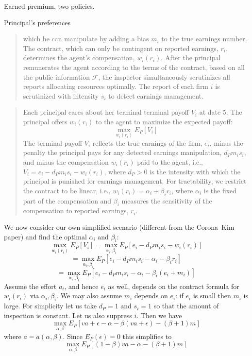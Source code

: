 \begin{example}{Earned premium, two policies.}
\begin{example}{Principal's preferences}
\begin{quote}
			which he can manipulate by adding a bias $m_i$ to the true earnings number.
			The contract, which can only be contingent on reported earnings, $r_i$, determines the agent’s compensation, $w_i(r_i)$.
			After the principal remunerates the agent according to the terms of the contract, based on all the public information $\mathscr F$,
			the inspector simultaneously scrutinizes all reports allocating resources optimally. The report of each firm $i$ is scrutinized with intensity $s_i$
			to detect earnings management. 
		\end{quote}
		\begin{quote}
		Each principal cares about her terminal terminal payoff $V_i$ at date 5. The principal offers $w_i (r_i)$ to the agent to maximize the expected payoff:
		\[
			\max_{w_i(r_i)} E_P[V_i]
		\]
		The terminal payoff $V_i$ reflects the true earnings of the firm, $e_i$, minus the penalty the principal pays for any detected earnings manipulation, $d_Pm_is_i$,
		and minus the compensation $w_i(r_i)$ paid to the agent, i.e., $V_i = e_i - d_Pm_is_i - w_i(r_i)$,
		where $d_P > 0$ is the intensity with which the principal is punished for earnings management.
		For tractability, we restrict the contract to be linear, i.e., $w_i(r_i) = \alpha_i +\beta_ir_i$,
		where $\alpha_i$ is the fixed part of the compensation and
		$\beta_i$ measures the sensitivity of the compensation to reported earnings, $r_i$.
		\end{quote}
		We now consider our own simplified scenario (different from the Corona--Kim paper) and find the  optimal $\alpha_i$ and $\beta_i$:
		\[
			\max_{w_i(r_i)} E_P[V_i] = \max_{\alpha_i,\beta_i} E_P[e_i - d_Pm_is_i - w_i(r_i)]
		\]
		\[
			= \max_{\alpha_i,\beta_i} E_P[e_i - d_Pm_is_i - \alpha_i - \beta_i r_i]
		\]
		\[
			= \max_{\alpha_i,\beta_i} E_P[e_i - d_Pm_is_i - \alpha_i - \beta_i (e_i+m_i)]
		\]
		Assume the effort $a_i$, and hence $e_i$ as well, depends on the contract formula for $w_i(r_i)$ via $\alpha_i,\beta_i$.
		We may also assume $m_i$ depends on $e_i$: if $e_i$ is small then $m_i$ is large.
		For simplicity let us take $d_P=1$ and $s_i=1$ so that the amount of inspection is constant.
		Let us also suppress $i$.
		Then we have
		\[
			\max_{\alpha,\beta} E_P[ va+\epsilon - \alpha - \beta (va+\epsilon) - (\beta+1)m]
		\]
		where $a=a(\alpha,\beta)$.
		Since $E_P(\epsilon)=0$ this simplifies to
		\[
			\max_{\alpha,\beta} E_P[ (1-\beta)va - \alpha - (\beta+1)m]
		\]

\end{example}
\end{example}
